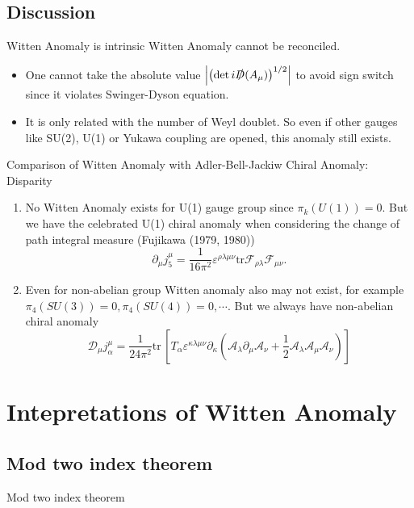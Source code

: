 \documentclass[10pt,aspectratio=43,xcolor=x11names]{beamer}%
\begin{document}
	\subsection{Discussion}
		\begin{frame}{Witten Anomaly is intrinsic}
			Witten Anomaly cannot be reconciled.\pause
			\begin{itemize}
				\item One cannot take the absolute value $\left|\left(\mathrm{det}\,i\slashed{D}(A_\mu)\right)^{1/2}\right|$ to avoid sign switch since it violates Swinger-Dyson equation.\pause 
				\item It is only related with the number of Weyl doublet. So even if other gauges like SU(2), U(1) or Yukawa coupling are opened, this anomaly still exists. 
			\end{itemize}
		\end{frame}
		\begin{frame}{Comparison of Witten Anomaly with Adler-Bell-Jackiw Chiral Anomaly: Disparity}
			\begin{enumerate}
				\item No Witten Anomaly exists for U(1) gauge group since $\pi_k(U(1))=0$. But we have the celebrated U(1) chiral anomaly when considering the change of path integral measure (Fujikawa (1979, 1980))
				\begin{equation*}
					\partial_\mu j_5^\mu=\dfrac{1}{16\pi^2}\varepsilon^{\rho\lambda\mu\nu}\mathrm{tr}\mathcal{F}_{\rho\lambda}\mathcal{F}_{\mu\nu}.
				\end{equation*}\pause
				\item Even for non-abelian group Witten anomaly also may not exist, for example $\pi_4(SU(3))=0,\pi_4(SU(4))=0,\cdots$. But we always have non-abelian chiral anomaly
				\begin{equation*}
					\mathcal{D}_\mu j^\mu_\alpha=\dfrac{1}{24\pi^2}\mathrm{tr}\,\left[T_\alpha \varepsilon^{\kappa\lambda\mu\nu}\partial_\kappa\left(\mathcal{A}_\lambda \partial_\mu\mathcal{A}_\nu+\dfrac{1}{2}\mathcal{A}_\lambda\mathcal{A}_\mu\mathcal{A}_\nu\right) \right] 
				\end{equation*}
			\end{enumerate}
		\end{frame}

\section{Intepretations of Witten Anomaly}
	\subsection{Mod two index theorem}
		\begin{block}{Mod two index theorem}
			
		\end{block}
\end{document}
